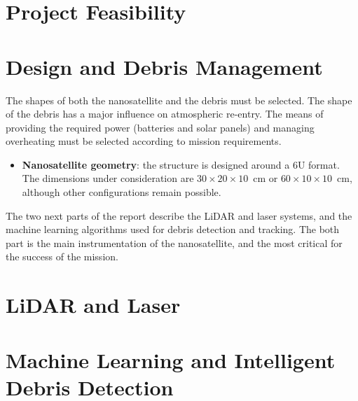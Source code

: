 \documentclass[12pt,a4paper]{article}
\begin{document}
{
  \small
  \setlength{\parindent}{0pt}
  \setlength{\parskip}{5pt}
  \renewcommand{\arraystretch}{1.15}
  \setlength{\tabcolsep}{5pt}
  
}

\section{Project Feasibility}
{
  \small
  \setlength{\parindent}{0pt}
  \setlength{\parskip}{5pt}
  \renewcommand{\arraystretch}{1.15}
  \setlength{\tabcolsep}{5pt}
  
}

\section{Design and Debris Management}


The shapes of both the nanosatellite and the debris must be selected. The shape
of the debris has a major influence on atmospheric re-entry. The means of
providing the required power (batteries and solar panels) and managing overheating
must be selected according to mission requirements.

\begin{itemize}
  \item \textbf{Nanosatellite geometry}: the structure is designed around a 6U
  format. The dimensions under consideration are $30 \times 20 \times 10$~cm
  or $60 \times 10 \times 10$~cm, although other configurations remain possible.
\end{itemize}

The two next parts of the report describe the LiDAR and laser systems, and the machine learning algorithms used for debris detection and tracking.
The both part is the main instrumentation of the nanosatellite, and the most critical for the success of the mission.

\section{LiDAR and Laser}
{
  \small
  \setlength{\parindent}{0pt}
  \setlength{\parskip}{5pt}
  \renewcommand{\arraystretch}{1.15}
  \setlength{\tabcolsep}{5pt}
  
}

\section{Machine Learning and Intelligent Debris Detection}

{
  \small
  \setlength{\parindent}{0pt}
  \setlength{\parskip}{5pt}
  \renewcommand{\arraystretch}{1.15}
  \setlength{\tabcolsep}{5pt}
  
}
\end{document}
